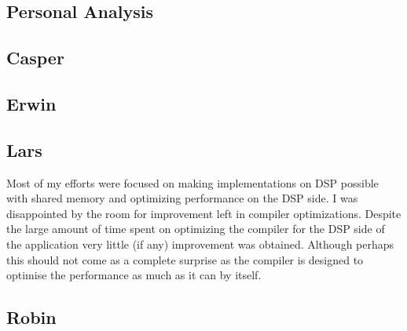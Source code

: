 \documentclass[final]{article} %
\begin{document}
\begin{appendices}

\section{Personal Analysis}\label{app:appendix-personal-analysis}

\subsection{Casper}


\subsection{Erwin}


\subsection{Lars}
Most of my efforts were focused on making implementations on DSP possible with shared memory and optimizing performance on the DSP side. I was disappointed by the room for improvement left in compiler optimizations. Despite the large amount of time spent on optimizing the compiler for the DSP side of the application very little (if any) improvement was obtained. Although perhaps this should not come as a complete surprise as the compiler is designed to optimise the performance as much as it can by itself.


\subsection{Robin}


\end{appendices}
\end{document}
